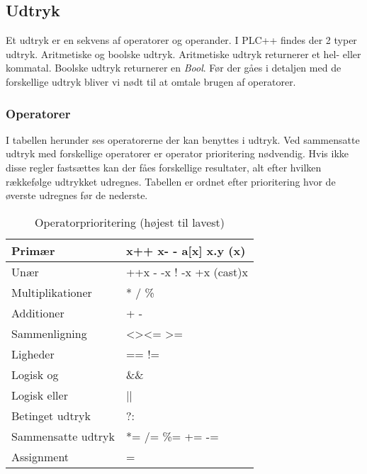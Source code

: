 \subsection{Udtryk}
Et udtryk er en sekvens af operatorer og operander. I PLC++ findes der 2 typer udtryk. Aritmetiske og boolske udtryk. Aritmetiske udtryk returnerer et hel- eller kommatal. Boolske udtryk returnerer en \textit{Bool}. Før der gåes i detaljen med de forskellige udtryk bliver vi nødt til at omtale brugen af operatorer.

\subsubsection{Operatorer}
I tabellen herunder ses operatorerne der kan benyttes i udtryk. Ved sammensatte udtryk med forskellige operatorer er operator prioritering nødvendig. Hvis ikke disse regler fastsættes kan der fåes forskellige resultater, alt efter hvilken rækkefølge udtrykket udregnes. Tabellen er ordnet efter prioritering hvor de øverste udregnes før de nederste.

\begin{table}[H]
    \centering
    \begin{tabular}{|l|l|}
        \hline
        \centering

        Primær             & x++ \quad x- - \quad a{[}x{]} \quad x.y \quad (x)                 \\ \hline
        Unær               & ++x \quad - -x \quad ! \quad -x \quad +x \quad (cast)x       \\ \hline
        Multiplikationer   & * \quad / \quad \%                                               \\ \hline
        Additioner         & + \quad -                                                        \\ \hline
        Sammenligning      & \textless \quad \textgreater \quad \textless= \quad\textgreater= \\ \hline
        Ligheder           & == \quad !=                                                      \\ \hline
        Logisk og          & \&\&                                                              \\ \hline
        Logisk eller       & ||                                                               \\ \hline
        Betinget udtryk    & ?:                                                               \\ \hline
        Sammensatte udtryk & *= \quad /= \quad \%= \quad += \quad -=                          \\ \hline
        Assignment         & =                                                                \\ \hline

    \end{tabular}
    \caption{Operatorprioritering (højest til lavest)}
    \label{tab:operatorprioritering}
\end{table}



